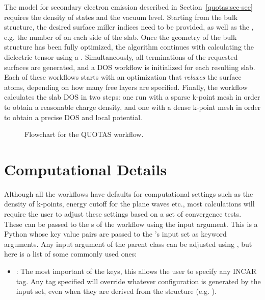 \begin{refsection}
The model for secondary electron emission described in 
Section~\ref{quotas:sec-see} requires the density of states and the vacuum level. 
Starting from the bulk structure, the desired surface miller indices need to 
be provided, as well as the , e.g. the number of 
 on each side of the slab. Once the geometry of the bulk 
structure has been fully optimized, the algorithm continues with calculating 
the dielectric tensor using a . Simultaneously, all 
terminations of the requested surfaces are generated, and a DOS workflow is 
initialized for each resulting slab. Each of these workflows starts with an 
optimization that \textit{relaxes} the surface atoms, depending on how many 
free layers are specified. Finally, the workflow calculates the slab DOS in 
two steps: one run with a sparse k-point mesh in order to obtain a reasonable 
charge density, and one with a dense k-point mesh in order to obtain a precise 
DOS and local potential. 
 
\begin{figure}[ht] 
 
\caption{\label{automation:fig-quotas} Flowchart for the QUOTAS workflow.} 
\end{figure} 
 
\section{Computational Details} \label{automation:sec-computational}
 
Although all the workflows have defaults for computational settings such as 
the density of k-points, energy cutoff for the plane waves etc., most 
calculations will require the user to adjust these settings based on a set of 
convergence tests. These can be passed to the s of the workflow 
using the  input argument. This is a Python  
whose key value pairs are passed to the 
's input 
set as keyword arguments. Any input argument of the parent  
class can be adjusted using , but here is a list of 
some commonly used ones: 
 
\begin{itemize} 
 
\item {}: The most important of the keys, this 
allows the user to specify any INCAR tag. Any tag specified will override 
whatever configuration is generated by the input set, even when they are 
derived from the structure (e.g. ). 
 

\end{itemize}
\end{refsection}
